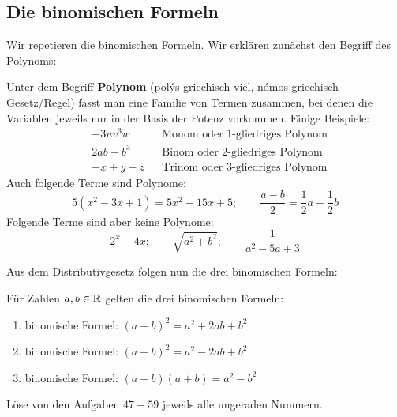\documentclass[11pt,oneside]{article}
\begin{document}
\subsection{Die binomischen Formeln}
    Wir repetieren die binomischen Formeln. Wir erklären zunächst den Begriff des Polynoms:
    \begin{definition}
    	Unter dem Begriff \textbf{Polynom} (pol\'{y}s griechisch viel, n\'{o}mos griechisch Gesetz/Regel) fasst man eine Familie von Termen zusammen, bei denen die Variablen jeweils nur in der Basis der Potenz vorkommen. Einige Beispiele:
    	\begin{align*}
    		&-3uv^{3}w &&\text{Monom oder 1-gliedriges Polynom} \\
    		&2ab - b^{3} &&\text{Binom oder 2-gliedriges Polynom} \\
    		&-x + y - z &&\text{Trinom oder 3-gliedriges Polynom}
    	\end{align*}
    	Auch folgende Terme sind Polynome:
    	\[5(x^{2} - 3x +1) = 5x^{2} - 15x + 5; \qquad \frac{a-b}{2} = \frac{1}{2}a - \frac{1}{2} b \]
    	Folgende Terme sind aber keine Polynome:
    	\[2^{x} - 4x; \qquad \sqrt{a^{2} + b^{2}}; \qquad \frac{1}{a^{2} - 5a + 3}\]
    \end{definition}
    Aus dem Distributivgesetz folgen nun die drei binomischen Formeln:
    \begin{satz}
	   Für Zahlen $a,b\in\mathbb{R}$ gelten die drei binomischen Formeln:
    	\begin{enumerate}[leftmargin=2cm]
    		\item binomische Formel: \qquad $(a+b)^{2} = a^{2} + 2ab + b^{2}$
    		\item binomische Formel: \qquad $(a-b)^{2} = a^{2} - 2ab + b^{2}$
    		\item binomische Formel: \qquad $(a-b)(a+b) = a^{2} - b^{2}$
    	\end{enumerate}
    \end{satz}
    \begin{aufgabe}
        Löse von den Aufgaben $47-59$ jeweils alle ungeraden Nummern.
    \end{aufgabe}
\end{document}
